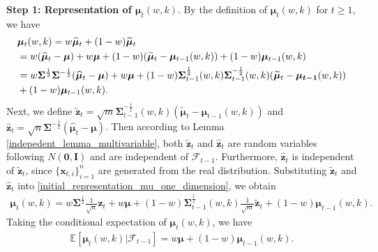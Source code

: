 \noindent
\textbf{Step 1: Representation of $\bm{\mu}_{t}(w,k)$}. By the definition of $\bm{\mu}_{t}(w,k)$ for $t\geq 1$, we have
\begin{align}
\label{initial_representation_mu_one_dimension}
&\bm{\mu}_{t}(w,k)=w \bm{\widehat{\mu}}_t + (1-w)\bm{\widetilde{\mu}}_{t} \notag
\\& =w(\bm{\widehat{\mu}}_t-\bm{\mu})+w\bm{\mu}+(1-w)(\bm{\widetilde{\mu}}_t-\bm{\mu}_{t-1}(w,k))+(1-w)\bm{\mu}_{t-1}(w,k)
\notag \\& =w\bm{\Sigma}^{\frac{1}{2}}\bm{\Sigma}^{-\frac{1}{2}}(
{\widehat{\bm{\mu}}_t-\bm{\mu}})+w\bm{\mu}+
(1-w)\bm{\Sigma}^{\frac{1}{2}
}_{t-1}(w,k)\bm{\Sigma}^{-\frac{1}{2}
}_{t-1}(w,k)(\widetilde{\bm{\mu}}_t-\bm{\mu_{t-1}}(w,k))\notag\\
&+(1-w)\bm{\mu}_{t-1}(w,k).
\end{align}
Next, we define $ \widetilde{\bm{z}}_t = \sqrt{m}\bm{\Sigma}^{-\frac{1}{2}
}_{t-1}(w,k)(\widetilde{\bm{\mu}}_t-\bm{\mu}_{t-1}(w,k))$ and $ \widehat{\bm{z}}_t = \sqrt{n} \bm{\Sigma}^{-\frac{1}{2}}(
{\widehat{\bm{\mu}}_t-\bm{\mu}}) $. Then according to Lemma \ref{indepedent_lemma_multivariable}, both $ \widetilde{\bm{z}}_t $ and $ \widehat{\bm{z}}_t $ are random variables following $ N(\bm{0},\bm{I}) $ and are independent of $ \mathcal{F}_{t-1} $. Furthermore, $ \widehat{\bm{z}}_t $ is independent of $ \widetilde{\bm{z}}_t $, since $ \{\bm{x}_{t,i}\}_{i=1}^n $ are generated from the real distribution. Substituting $ \widetilde{\bm{z}}_t $ and $ \widehat{\bm{z}}_t $ into \eqref{initial_representation_mu_one_dimension}, we obtain
\begin{align}
\label{representaion_one_dimension_mu}
\bm{\mu}_{t}(w,k)=w\bm{\Sigma}^{\frac{1}{2}
} \frac{1}{\sqrt{n}}\widehat{\bm{z}}_t+w\bm{\mu}+(1-w)\bm{\Sigma}_{t-1}^{\frac{1}{2}}(w,k)\frac{1}{\sqrt{m}}\widetilde{\bm z}_t+(1-w)\bm{\mu}_{t-1}(w,k).
\end{align}
Taking the conditional expectation of $\bm{\mu}_{t}(w,k)$, we have
\begin{align*}
    \mathbb{E}[\bm{\mu}_{t}(w,k)|\mathcal{F}_{t-1}] =w \bm{\mu} + (1-w) \bm{\mu}_{t-1}(w,k).
\end{align*}

